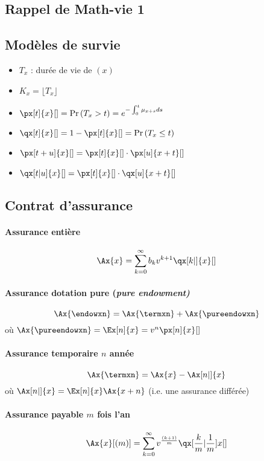 \documentclass[10pt, french]{article}
\begin{document}
\begin{multicols*}{3} %
\section{Rappel de Math-vie 1}
\subsection*{Modèles de survie}
\begin{itemize}
\item $T_x$ : durée de vie de $(x)$
\item $K_x =  \lfloor T_x \rfloor$
\item $\px[t]{x}[] = \prob{T_x > t} = e^{- \int_{0}^{t} \mu_{x+s} ds}$
\item $\qx[t]{x}[] = 1 - \px[t]{x}[] = \prob{T_x \leq t}$
\item $\px[t + u]{x}[] = \px[t]{x}[] \cdot \px[u]{x+t}[]$
\item $\qx[t|u]{x}[] = \px[t]{x}[] \cdot \qx[u]{x+t}[]$
\end{itemize}

\subsection*{Contrat d'assurance}
\paragraph{Assurance entière}
\[\Ax{x} = \sum_{k=0}^{\infty} b_k v^{k+1} \qx[k|]{x}[]\]
\paragraph{Assurance dotation pure (\emph{pure endowment)}}
\[\Ax{\endowxn} = \Ax{\termxn} + \Ax{\pureendowxn}\]
où $\Ax{\pureendowxn} = \Ex[n]{x} = v^n \px[n]{x}[]$

\paragraph{Assurance temporaire $n$ année}
\[\Ax{\termxn} = \Ax{x} - \Ax[n|]{x} \]
où $\Ax[n|]{x}  = \Ex[n]{x} \Ax{x+n}$ (i.e. une assurance différée)

\paragraph{Assurance payable $m$ fois l'an}
\[\Ax{x}[(m)] = \sum_{k=0}^{\infty} v^{\frac{(k+1)}{m}} \qx[\frac{k}{m} | \frac{1}{m}]{x}[] \]



\end{multicols*}
\end{document}
